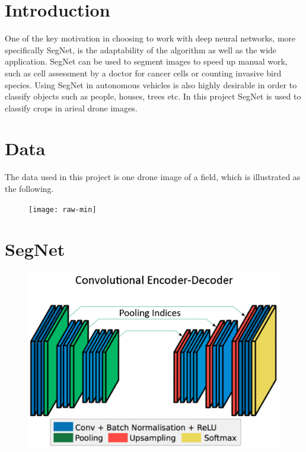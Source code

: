 \documentclass[
]{dtuposter}
\begin{document}
%
%
\begin{dtuposterhead} %
\end{dtuposterhead}
%
%
\begin{dtupostercontent}
\section{Introduction}
 One of the key motivation in choosing to work with deep neural networks, more specifically
 SegNet, is the adaptability of the algorithm as well as the wide application. SegNet can be
 used to segment images to speed up manual work, such as cell assessment by a doctor for
 cancer cells or counting invasive bird species. Using SegNet in autonomous vehicles is also
 highly desirable in order to classify objects such as people, houses, trees etc. In this project SegNet is used to classify crops in arieal drone images. 
 
\section{Data}
The data used in this project is one drone image of a field, which is illustrated as the following.
\begin{figure}
\centering
\texttt{[image: raw-min]}
\end{figure}


\section{SegNet}


\begin{figure}
	\centering
	\includegraphics[width=0.8\linewidth]{Structure}
	\caption{}
	\label{fig:Structure}
\end{figure}


\end{dtupostercontent}
\end{document}
